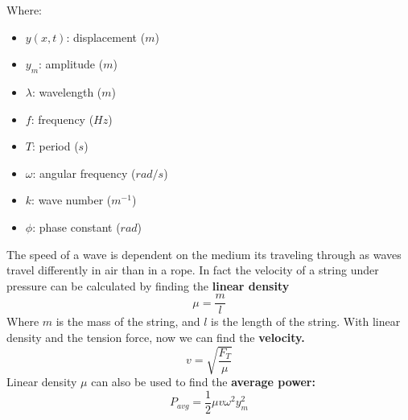 \documentclass[11pt]{article}
\begin{document}
\hfill
\begin{minipage}[b]{0.5\textwidth}
    Where:
    \begin{itemize}
        \item $y(x,t)$: displacement ($m$)
        \item $y_m$: amplitude ($m$)
        \item $\lambda$: wavelength ($m$)
        \item $f$: frequency ($Hz$)
        \item $T$: period ($s$)
        \item $\omega$: angular frequency ($rad/s$)
        \item $k$: wave number ($m^{-1}$)
        \item $\phi$: phase constant ($rad$)
        \end{itemize}
\end{minipage}
\newline




 \noindent The speed of a wave is dependent on the medium its traveling through as waves travel differently in air than in a rope.
    In fact the velocity of a string under pressure can be calculated by
    finding the \textbf{linear density}
    \begin{equation}
        \mu = \frac{m}{l} \tag{linear density}
    \end{equation}
    Where $m$ is the mass of the string, and $l$ is the length of the string.
    With linear density and the tension force, now we can find the \textbf{velocity.}
    \begin{equation}
        v = \sqrt {\frac{F_T}{\mu}} \tag{wave velocity}
    \end{equation}
    Linear density $\mu$ can also be used to find the \textbf{average power:}
    \begin{equation}
        P_{avg} = \frac{1}{2} \mu v \omega^2 y_m^2 \tag{average power}
    \end{equation}
\end{document}
